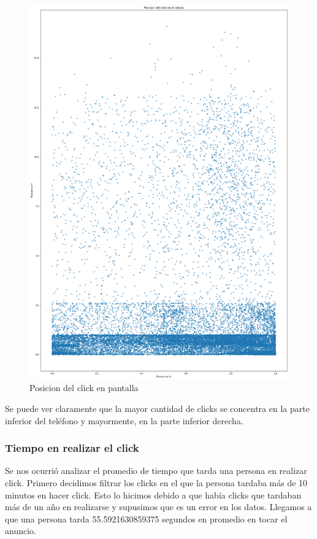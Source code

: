 \documentclass[a4paper, 12pt]{article}
\begin{document}
		\begin{figure}[h]
			\centering
			\includegraphics[scale=0.2]{images/clicks/clicks_touch_scatter.png}
			\caption{Posicion del click en pantalla}
		\end{figure}



		 Se puede ver claramente que la mayor cantidad de clicks se concentra en la parte inferior del teléfono y
		mayormente, en la parte inferior derecha.


	\subsubsection{Tiempo en realizar el click}
 
		 Se nos ocurrió analizar el promedio de tiempo que tarda una persona en realizar click. Primero decidimos filtrar los clicks en el que la persona tardaba más de 10 minutos en hacer click. Esto lo hicimos debido a que había clicks que tardaban más de un año en realizarse y supusimos que es un error en los datos. Llegamos a que una persona tarda 55.5921630859375 segundos en promedio en tocar el anuncio.
\end{document}
